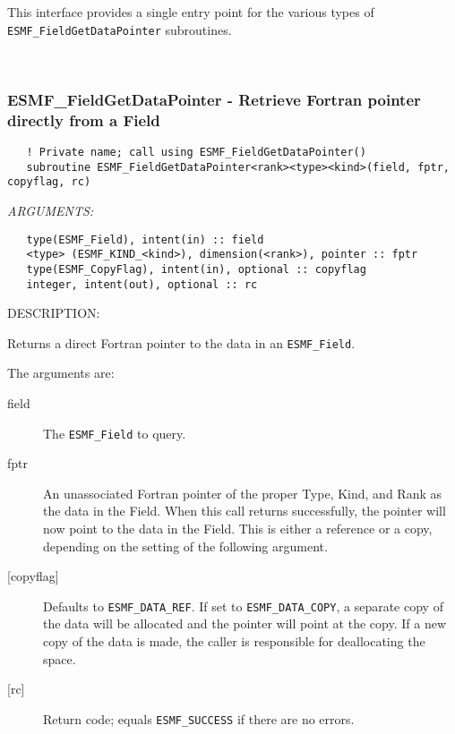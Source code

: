    This interface provides a single entry point for the various
   types of {\tt ESMF\_FieldGetDataPointer} subroutines.
   
 
\mbox{}\hrulefill\ 
 
\subsubsection [ESMF\_FieldGetDataPointer] {ESMF\_FieldGetDataPointer - Retrieve Fortran pointer directly from a Field }


  
\begin{verbatim}   ! Private name; call using ESMF_FieldGetDataPointer() 
   subroutine ESMF_FieldGetDataPointer<rank><type><kind>(field, fptr, copyflag, rc) 
   \end{verbatim}{\em ARGUMENTS:}
\begin{verbatim}   type(ESMF_Field), intent(in) :: field 
   <type> (ESMF_KIND_<kind>), dimension(<rank>), pointer :: fptr 
   type(ESMF_CopyFlag), intent(in), optional :: copyflag 
   integer, intent(out), optional :: rc 
   \end{verbatim}
{\sf DESCRIPTION:\\ }

 
   Returns a direct Fortran pointer to the data in an {\tt ESMF\_Field}. 
   
   The arguments are: 
   \begin{description} 
   \item[field] 
   The {\tt ESMF\_Field} to query. 
   \item[fptr] 
   An unassociated Fortran pointer of the proper Type, Kind, and Rank as 
   the data in the Field. When this call returns successfully, the pointer 
   will now point to the data in the Field. This is either a reference or 
   a copy, depending on the setting of the following argument. 
   \item[{[copyflag]}] 
   Defaults to {\tt ESMF\_DATA\_REF}. If set to {\tt ESMF\_DATA\_COPY}, 
   a separate copy of the data will be allocated and the pointer will point 
   at the copy. If a new copy of the data is made, the caller is 
   responsible for deallocating the space. 
   \item[{[rc]}] 
   Return code; equals {\tt ESMF\_SUCCESS} if there are no errors. 
   \end{description} 
   
